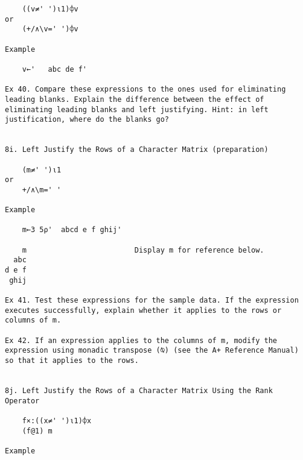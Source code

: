 \documentclass{article}
\begin{document}
\begin{verbatim}
	((v≠' ')⍳1)⌽v                                                        
or                                                                    
	(+/∧\v=' ')⌽v                                                        

Example                                                               

  	v←'   abc de f'                                                    

Ex 40. Compare these expressions to the ones used for eliminating     
leading blanks. Explain the difference between the effect of          
eliminating leading blanks and left justifying. Hint: in left         
justification, where do the blanks go?                                


8i. Left Justify the Rows of a Character Matrix (preparation)         

	(m≠' ')⍳1                                                            
or                                                                    
	+/∧\m=' '                                                            

Example                                                               

	m←3 5⍴'  abcd e f ghij'                                              

	m                         Display m for reference below.             
  abc                                                                 
d e f                                                                 
 ghij                                                                 

Ex 41. Test these expressions for the sample data. If the expression  
executes successfully, explain whether it applies to the rows or      
columns of m.                                                         

Ex 42. If an expression applies to the columns of m, modify the       
expression using monadic transpose (⍉) (see the A+ Reference Manual)  
so that it applies to the rows.                                       


8j. Left Justify the Rows of a Character Matrix Using the Rank        
Operator                                                              

	f×:((x≠' ')⍳1)⌽x                                                   
	(f@1) m                                                              

Example                                                               


\end{verbatim}
\end{document}
